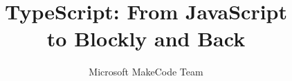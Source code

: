 \documentclass[sigplan,10pt]{acmart}
\begin{document}
\title{TypeScript: From JavaScript \\ to Blockly and Back}         %
\subtitle{Microsoft MakeCode Team}                     %




\end{document}
